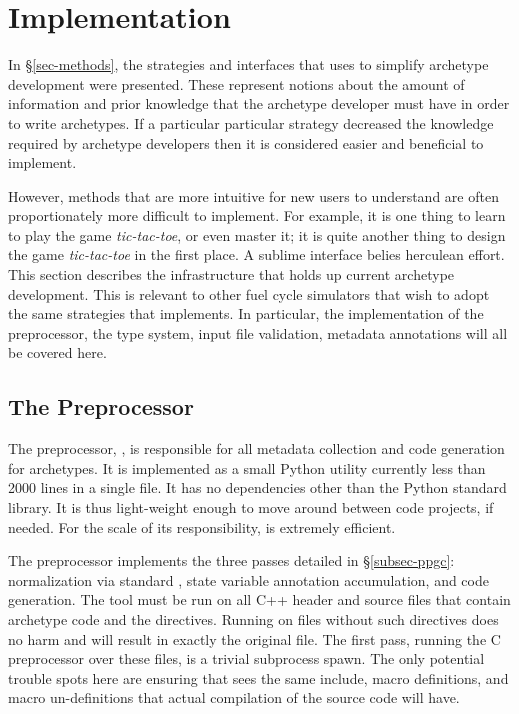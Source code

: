 \section{Implementation}
\label{sec-impl}

In \S \ref{sec-methods}, the strategies and interfaces that \Cyclus uses to 
simplify archetype development were presented. These represent notions about
the amount of information and prior knowledge that the archetype developer 
must have in order to write archetypes.  If a particular particular strategy 
decreased the knowledge required by archetype developers then it is considered
easier and beneficial to implement.  

However, methods that are more intuitive for new users to understand are often
proportionately more difficult to implement. For example, it is one thing to 
learn to play the game \emph{tic-tac-toe}, or even master it; it is quite another
thing to design the game \emph{tic-tac-toe} in the first place.  
A sublime interface belies 
herculean effort. This section describes the infrastructure that holds up 
current \cyclus archetype development.  This is relevant to other fuel 
cycle simulators that wish to adopt the same strategies that \cyclus 
implements. In particular, the implementation of the \cyclus preprocessor, 
the type system, input file validation, metadata annotations will all 
be covered here.

\subsection{The \Cyclus Preprocessor}

The \cyclus preprocessor, \cycpp, is responsible for all metadata collection and 
code generation for archetypes. It is implemented as a small Python utility 
currently less than 2000 lines in a single file.  It has no dependencies other 
than the Python standard library. It is thus light-weight enough to move around 
between code projects, if needed. For the scale of its responsibility, \cycpp
is extremely efficient. 

The preprocessor implements the three passes detailed in \S\ref{subsec-ppgc}:
normalization via standard , state variable annotation accumulation, and code 
generation. The \cycpp tool must be run on all C++ header and source files that
contain archetype code and the  directives. Running \cycpp
on files without such directives does no harm and will result in exactly the 
original file. The first \cycpp
pass, running the C preprocessor over these files, is a trivial subprocess 
spawn. The only potential trouble spots here are ensuring that \cycpp sees the
same include, macro definitions, and macro un-definitions that actual compilation 
of the source code will have.

